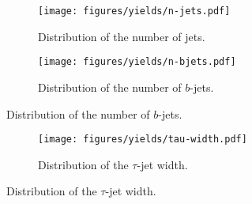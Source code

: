 \begin{figure}[htb!]
    \centering
    \begin{subfigure}{0.45\textwidth}
        \texttt{[image: figures/yields/n-jets.pdf]}
        \caption{Distribution of the number of jets.}
    \end{subfigure}\hfill%
    \begin{subfigure}{0.45\textwidth}
        \texttt{[image: figures/yields/n-bjets.pdf]}
        \caption{Distribution of the number of $b$-jets.}
    \end{subfigure}
\end{figure}

\begin{figure}[htb!]
    \centering
    \begin{subfigure}{0.45\textwidth}
        \texttt{[image: figures/yields/tau-width.pdf]}
        \caption{Distribution of the $\tau$-jet width.}
    \end{subfigure}\hfill%
\end{figure}